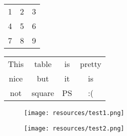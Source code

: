 \documentclass{article}
\begin{document}
\begin{tabular}{|c|c|c|}
\hline
1 & 2 & 3 \\
4 & 5 & 6 \\
7 & 8 & 9 \\
\hline
\end{tabular}
\begin{tabular}{|c|c|c|c|}
\hline
This & table & is & pretty \\
nice & but & it & is \\
not & square & PS & :( \\
\hline
\end{tabular}
\begin{figure}[h]
    \centering
    \texttt{[image: resources/test1.png]}
\end{figure}
\begin{figure}[h]
    \centering
    \texttt{[image: resources/test2.png]}
\end{figure}
\end{document}
